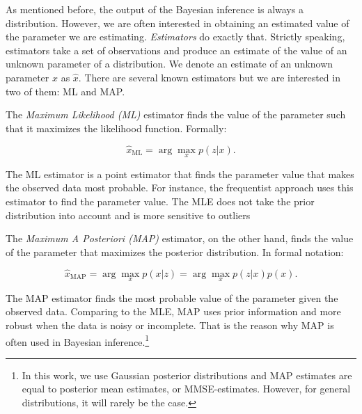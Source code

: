 As mentioned before, the output of the Bayesian inference is always a
distribution. However, we are often interested in obtaining an estimated value
of the parameter we are estimating. \textit{Estimators} do exactly that.
Strictly speaking, estimators take a set of observations and produce an 
estimate of the value of an unknown parameter of a distribution. We denote an
estimate of an unknown parameter $x$ as $\hat{x}$. There are several known 
estimators but we are interested in two of them: ML and MAP.

The \textit{Maximum Likelihood (ML)} estimator finds the value of the parameter 
such that it maximizes the likelihood function. Formally:

\begin{equation}
\hat{x}_{\mathrm{ML}} = \arg \max_x p(z|x).
\end{equation}

The ML estimator is a point estimator that finds the parameter value that 
makes the observed data most probable. For instance, the frequentist approach
uses this estimator to find the parameter value. The MLE does not take the 
prior distribution into account and is more sensitive to outliers \cite{bar-shalomEstimationApplicationsTracking2001} 

The \textit{Maximum A Posteriori (MAP)} estimator, on the other hand, finds the 
value of the parameter that maximizes the posterior distribution. In formal 
notation:

\begin{equation}
\hat{x}_{\mathrm{MAP}} = \arg \max_x p(x|z) = \arg \max_x p(z|x)p(x).
\end{equation}

The MAP estimator finds the most probable value of the parameter given the 
observed data. Comparing to the MLE, MAP uses prior information and more robust
when the data is noisy or incomplete. That is the reason why MAP is often used
in Bayesian inference.\footnote{
    In this work, we use Gaussian posterior distributions and MAP estimates are 
    equal to posterior mean estimates, or MMSE-estimates. However, for general 
    distributions, it will rarely be the case.
}

